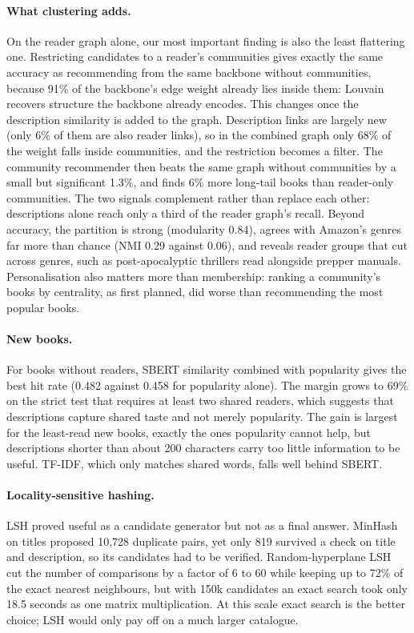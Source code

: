 \paragraph{What clustering adds.}
On the reader graph alone, our most important finding is also the least
flattering one. Restricting candidates to a reader's communities gives exactly
the same accuracy as recommending from the same backbone without communities,
because 91\% of the backbone's edge weight already lies inside them: Louvain
recovers structure the backbone already encodes. This changes once the
description similarity is added to the graph. Description links are largely new
(only 6\% of them are also reader links), so in the combined graph only 68\% of
the weight falls inside communities, and the restriction becomes a filter. The
community recommender then beats the same graph without communities by a small
but significant 1.3\%, and finds 6\% more long-tail books than reader-only
communities. The two signals complement rather than replace each other:
descriptions alone reach only a third of the reader graph's recall. Beyond
accuracy, the partition is strong (modularity 0.84), agrees with Amazon's genres
far more than chance (NMI 0.29 against 0.06), and reveals reader groups that cut
across genres, such as post-apocalyptic thrillers read alongside prepper
manuals. Personalisation also matters more than membership: ranking a
community's books by centrality, as first planned, did worse than recommending
the most popular books.

\paragraph{New books.}
For books without readers, SBERT similarity combined with popularity gives the
best hit rate (0.482 against 0.458 for popularity alone). The margin grows to
69\% on the strict test that requires at least two shared readers, which suggests
that descriptions capture shared taste and not merely popularity. The gain is
largest for the least-read new books, exactly the ones popularity cannot help,
but descriptions shorter than about 200 characters carry too little information
to be useful. TF-IDF, which only matches shared words, falls well behind SBERT.

\paragraph{Locality-sensitive hashing.}
LSH proved useful as a candidate generator but not as a final answer. MinHash
on titles proposed 10,728 duplicate pairs, yet only 819 survived a check on
title and description, so its candidates had to be verified. Random-hyperplane
LSH cut the number of comparisons by a factor of 6 to 60 while keeping up to
72\% of the exact nearest neighbours, but with 150k candidates an exact search
took only 18.5 seconds as one matrix multiplication. At this scale exact search
is the better choice; LSH would only pay off on a much larger catalogue.

